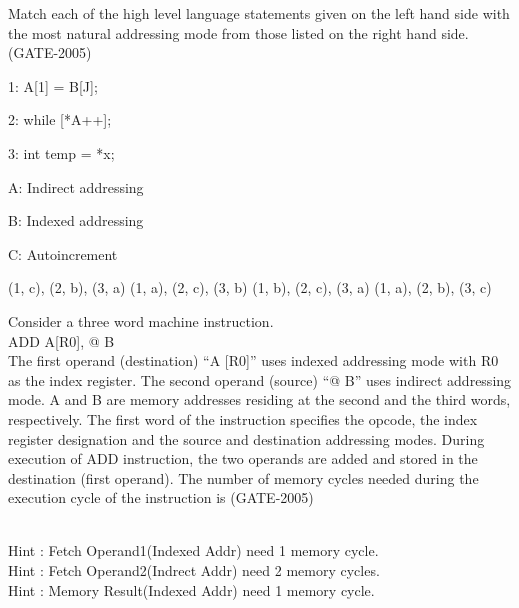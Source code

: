 \begin{questyle}
  \question  Match each of the high level language statements given on the left hand side with
            the most natural addressing mode from those listed on the right hand side.  (GATE-2005)

  \begin{multiColList}[2]
    \item[1:] A[1] = B[J];
    \item[2:] while [*A++];
    \item[3:] int temp = *x;
    \item[A:] Indirect addressing
    \item[B:] Indexed addressing
    \item[C:] Autoincrement
  \end{multiColList}

  \begin{oneparchoices}
    \choice         (1, c), (2, b), (3, a)
    \choice         (1, a), (2, c), (3, b)
    \CorrectChoice  (1, b), (2, c), (3, a)
    \choice         (1, a), (2, b), (3, c)
  \end{oneparchoices}
\end{questyle}


\begin{questyle}
  \question  Consider a three word machine instruction. \\  ADD A[R0], @ B \\  The first operand
  (destination) “A [R0]” uses indexed addressing mode with R0 as the index register. The second
  operand (source) “@ B” uses indirect addressing mode. A and B are memory addresses residing at
  the second and the third words, respectively. The first word of the instruction specifies the
  opcode, the index register designation and the source and destination addressing modes. During
  execution of ADD instruction, the two operands are added and stored in the destination (first operand).
  The number of memory cycles needed during the execution cycle of the instruction is (GATE-2005)

  \begin{oneparchoices}
  \end{oneparchoices}
  \\ Hint : Fetch Operand1(Indexed Addr) need 1 memory cycle. \\ Hint : Fetch Operand2(Indrect Addr) need 2 memory cycles. \\
            Hint : Memory Result(Indexed Addr) need 1 memory cycle.
\end{questyle}


